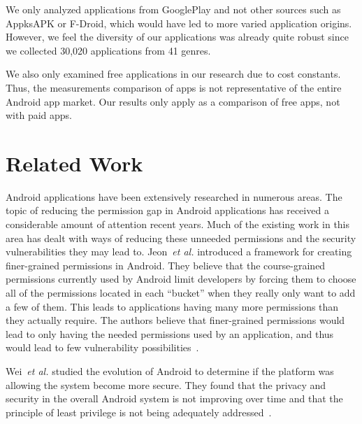 \documentclass[conference]{IEEEtran}
\newcommand{\todo}[1]{\textcolor{cyan}{\textbf{[#1]}}}
\begin{document}
We only analyzed applications from GooglePlay and not other sources such as AppksAPK or F-Droid, which would have led to more varied application origins. However, we feel the diversity of our applications was already quite robust since we collected 30,020 applications from 41 genres.

We also only examined free applications in our research due to cost constants. Thus, the measurements comparison of apps is not representative of the entire Android app market. Our results only apply as a comparison of free apps, not with paid apps.


\section{Related Work}
\label{sec: relatedwork}


Android applications have been extensively researched in numerous areas. The topic of reducing the permission gap in Android applications has received a considerable amount of attention recent years. Much of the existing work in this area has dealt with ways of reducing these unneeded permissions and the security vulnerabilities they may lead to. Jeon~\emph{et al.} introduced a framework for creating finer-grained permissions in Android. They believe that the course-grained permissions currently used by Android limit developers by forcing them to choose all of the permissions located in each ``bucket'' when they really only want to add a few of them. This leads to applications having many more permissions than they actually require. The authors believe that finer-grained permissions would lead to only having the needed permissions used by an application, and thus would lead to few vulnerability possibilities~\cite{jeon2011dr}.

Wei~\emph{et al.} studied the evolution of Android to determine if the platform was allowing the system become more secure. They found that the privacy and security in the overall Android system is not improving over time and that the principle of least privilege is not being adequately addressed~\cite{Wei:2012:PEA:2420950.2420956}.
\end{document}

